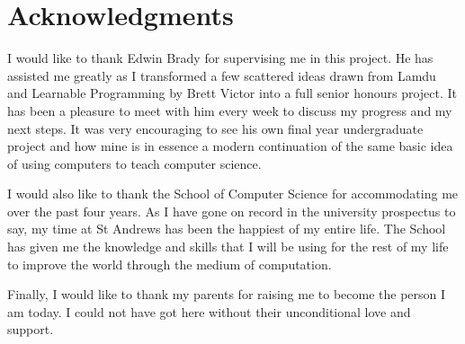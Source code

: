 \cleardoublepage
{}
{}
\chapter*{Acknowledgments}
\vspace{1.0in}
I would like to thank Edwin Brady for supervising me in this project. He has assisted me greatly as I transformed a few scattered ideas drawn from Lamdu and Learnable Programming by Brett Victor into a full senior honours project. It has been a pleasure to meet with him every week to discuss my progress and my next steps. It was very encouraging to see his own final year undergraduate project and how mine is in essence a modern continuation of the same basic idea of using computers to teach computer science.

I would also like to thank the School of Computer Science for accommodating me over the past four years. As I have gone on record in the university prospectus to say, my time at St Andrews has been the happiest of my entire life. The School has given me the knowledge and skills that I will be using for the rest of my life to improve the world through the medium of computation.

Finally, I would like to thank my parents for raising me to become the person I am today. I could not have got here without their unconditional love and support.
\\
\\
\\ 
\\
\\
\newpage
